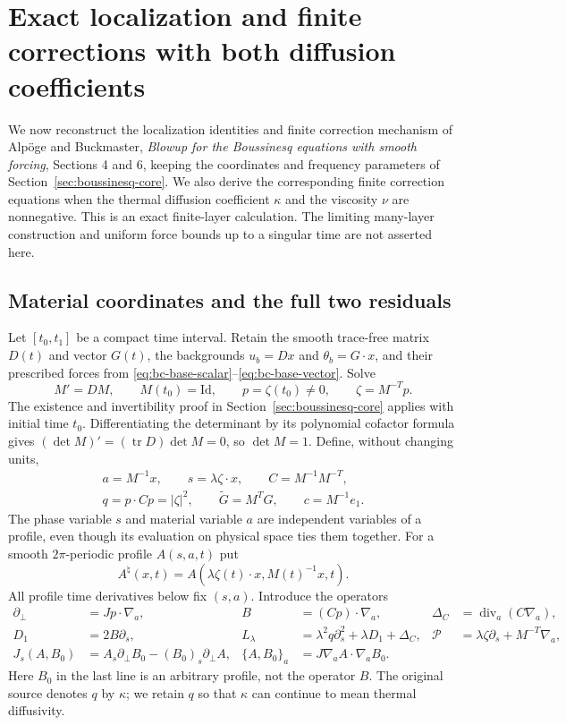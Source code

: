 \section{Exact localization and finite corrections with both diffusion coefficients}
\label{sec:localized-layer}

We now reconstruct the localization identities and finite correction mechanism
of Alp\"oge and Buckmaster, \emph{Blowup for the Boussinesq equations with
smooth forcing}, Sections 4 and 6, keeping the coordinates and frequency
parameters of Section~\ref{sec:boussinesq-core}. We also derive the
corresponding finite correction equations when the thermal diffusion
coefficient $\kappa$ and the viscosity $\nu$ are nonnegative. This is an
exact finite-layer calculation. The limiting many-layer construction and
uniform force bounds up to a singular time are not asserted here.

\subsection{Material coordinates and the full two residuals}

Let $[t_0,t_1]$ be a compact time interval. Retain the smooth trace-free
matrix $D(t)$ and vector $G(t)$, the backgrounds $u_b=Dx$ and
$\theta_b=G\cdot x$, and their prescribed forces from
\eqref{eq:bc-base-scalar}--\eqref{eq:bc-base-vector}.
Solve
\[
M'=DM,\qquad M(t_0)=\mathrm{Id},\qquad
p=\zeta(t_0)\ne0,\qquad \zeta=M^{-T}p.
\]
The existence and invertibility proof in Section~\ref{sec:boussinesq-core}
applies with initial time $t_0$. Differentiating the determinant by its
polynomial cofactor formula gives
$(\det M)'=(\operatorname{tr}D)\det M=0$, so $\det M=1$.
Define, without changing units,
\begin{gather*}
a=M^{-1}x,\qquad s=\lambda\zeta\cdot x,\qquad C=M^{-1}M^{-T},\\
q=p\cdot Cp=|\zeta|^2,\qquad
\widetilde G=M^TG,\qquad c=M^{-1}e_1.
\end{gather*}
The phase variable $s$ and material variable $a$ are independent variables
of a profile, even though its evaluation on physical space ties them
together. For a smooth $2\pi$-periodic profile $A(s,a,t)$ put
\[
A^\natural(x,t)=A(\lambda\zeta(t)\cdot x,M(t)^{-1}x,t).
\]
All profile time derivatives below fix $(s,a)$. Introduce the operators
\begin{align*}
\partial_\perp&=Jp\cdot\nabla_a,&
B&=(Cp)\cdot\nabla_a,&
\Delta_C&=\operatorname{div}_a(C\nabla_a),\\
D_1&=2B\partial_s,&
L_\lambda&=\lambda^2q\partial_s^2+\lambda D_1+\Delta_C,&
\mathcal P&=\lambda\zeta\partial_s+M^{-T}\nabla_a,\\
J_s(A,B_0)&=A_s\partial_\perp B_0-(B_0)_s\partial_\perp A,&
\{A,B_0\}_a&=J\nabla_aA\cdot\nabla_aB_0.
\end{align*}
Here $B_0$ in the last line is an arbitrary profile, not the operator $B$.
The original source denotes $q$ by $\kappa$; we retain $q$ so that
$\kappa$ can continue to mean thermal diffusivity.

